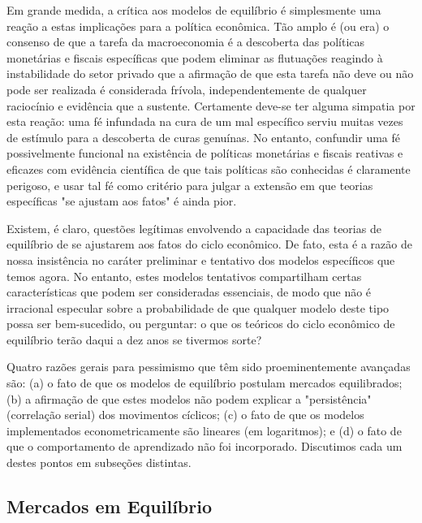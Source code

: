 \documentclass[12pt]{article}
\begin{document}
Em grande medida, a crítica aos modelos de equilíbrio é simplesmente uma reação a estas implicações para a política econômica. Tão amplo é (ou era) o consenso de que a tarefa da macroeconomia é a descoberta das políticas monetárias e fiscais específicas que podem eliminar as flutuações reagindo à instabilidade do setor privado que a afirmação de que esta tarefa não deve ou não pode ser realizada é considerada frívola, independentemente de qualquer raciocínio e evidência que a sustente. Certamente deve-se ter alguma simpatia por esta reação: uma fé infundada na cura de um mal específico serviu muitas vezes de estímulo para a descoberta de curas genuínas. No entanto, confundir uma fé possivelmente funcional na existência de políticas monetárias e fiscais reativas e eficazes com evidência científica de que tais políticas são conhecidas é claramente perigoso, e usar tal fé como critério para julgar a extensão em que teorias específicas "se ajustam aos fatos" é ainda pior.

Existem, é claro, questões legítimas envolvendo a capacidade das teorias de equilíbrio de se ajustarem aos fatos do ciclo econômico. De fato, esta é a razão de nossa insistência no caráter preliminar e tentativo dos modelos específicos que temos agora. No entanto, estes modelos tentativos compartilham certas características que podem ser consideradas essenciais, de modo que não é irracional especular sobre a probabilidade de que qualquer modelo deste tipo possa ser bem-sucedido, ou perguntar: o que os teóricos do ciclo econômico de equilíbrio terão daqui a dez anos se tivermos sorte?

Quatro razões gerais para pessimismo que têm sido proeminentemente avançadas são: (a) o fato de que os modelos de equilíbrio postulam mercados equilibrados; (b) a afirmação de que estes modelos não podem explicar a "persistência" (correlação serial) dos movimentos cíclicos; (c) o fato de que os modelos implementados econometricamente são lineares (em logaritmos); e (d) o fato de que o comportamento de aprendizado não foi incorporado. Discutimos cada um destes pontos em subseções distintas.

\subsection{Mercados em Equilíbrio}
\end{document}

